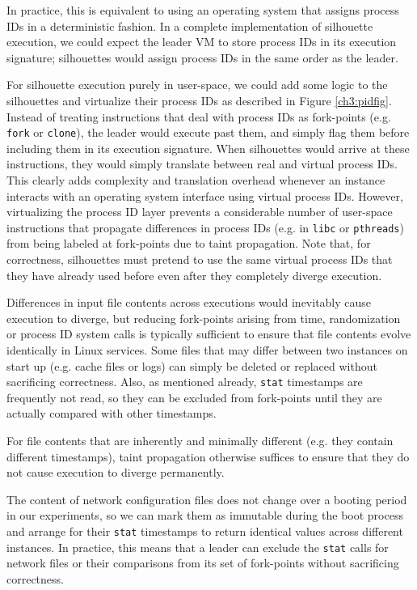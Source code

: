 In practice, this is equivalent
to using an operating system that assigns
process IDs in a deterministic fashion.
In a complete implementation of silhouette
execution, we could expect the leader VM
to store process IDs in its execution 
signature; silhouettes would assign process IDs
in the same order as the leader.

For silhouette execution purely in 
user-space, we could add some logic to the silhouettes 
and virtualize their process IDs as described
in Figure \ref{ch3:pidfig}.
Instead of treating instructions that deal with process IDs as 
fork-points (e.g. \texttt{fork} or \texttt{clone}), the leader
would execute past them, and simply flag them before
including them in its execution signature.
When silhouettes would arrive at these 
instructions, they would simply translate
between real and virtual process IDs.
This clearly adds complexity and translation overhead
whenever an instance interacts 
with an operating system interface using 
virtual process IDs. However, virtualizing
the process ID layer prevents
a considerable number of user-space instructions 
that propagate differences
in process IDs (e.g. in \texttt{libc} or \texttt{pthreads}) from being labeled at fork-points
due to taint propagation.
Note that,  for correctness, silhouettes
must pretend to use the same virtual process IDs
that they have already used before even after they completely 
diverge execution.\newline

 \newline
Differences in input file contents across
executions would inevitably cause execution
to diverge, but reducing fork-points arising
from time, randomization or process ID system calls
is typically sufficient to ensure that
file contents evolve identically in Linux services. 
Some files that may differ
between two instances on start up (e.g. 
cache files or logs) can simply be 
deleted or replaced without sacrificing correctness.
Also, as mentioned already, \texttt{stat} 
timestamps are frequently not read, so
they can be excluded from fork-points until
they are actually compared with
other timestamps.

For file contents that are inherently and minimally different
(e.g. they contain different timestamps),
taint propagation otherwise suffices to ensure that 
they do not cause execution to diverge permanently. \newline

 \newline
The content of network configuration files
does not change over a booting period in our experiments,
so we can mark them as immutable
during the boot process and
arrange for their \texttt{stat} timestamps
to return identical values across different
instances. In practice,
this means that a leader can 
exclude the \texttt{stat}
calls for network files
or their comparisons from its
set of fork-points without
sacrificing correctness.

